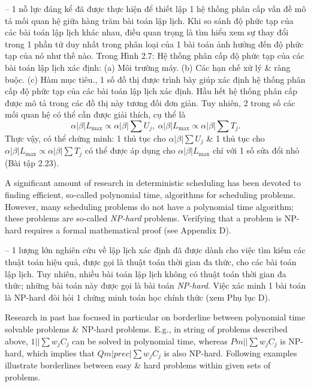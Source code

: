\documentclass{article}
\begin{document}
\begin{itemize}
\begin{itemize}
        -- 1 nỗ lực đáng kể đã được thực hiện để thiết lập 1 hệ thống phân cấp vấn đề mô tả mối quan hệ giữa hàng trăm bài toán lập lịch. Khi so sánh độ phức tạp của các bài toán lập lịch khác nhau, điều quan trọng là tìm hiểu xem sự thay đổi trong 1 phần tử duy nhất trong phân loại của 1 bài toán ảnh hưởng đến độ phức tạp của nó như thế nào. Trong {\sf Hình 2.7: Hệ thống phân cấp độ phức tạp của các bài toán lập lịch xác định: (a) Môi trường máy. (b) Các hạn chế xử lý \& ràng buộc. (c) Hàm mục tiêu.}, 1 số đồ thị được trình bày giúp xác định hệ thống phân cấp độ phức tạp của các bài toán lập lịch xác định. Hầu hết hệ thống phân cấp được mô tả trong các đồ thị này tương đối đơn giản. Tuy nhiên, 2 trong số các mối quan hệ có thể cần được giải thích, cụ thể là
        \begin{equation*}
            \alpha|\beta|L_{\max}\propto\alpha|\beta|\sum U_j,\ \alpha|\beta|L_{\max}\propto\alpha|\beta|\sum T_j.
        \end{equation*}
        Thực vậy, có thể chứng minh: 1 thủ tục cho $\alpha|\beta|\sum U_j$ \& 1 thủ tục cho $\alpha|\beta|L_{\max}\propto\alpha|\beta|\sum T_j$ có thể được áp dụng cho $\alpha|\beta|L_{\max}$ chỉ với 1 số sửa đổi nhỏ (Bài tập 2.23).

        A significant amount of research in deterministic scheduling has been devoted to finding efficient, so-called polynomial time, algorithms for scheduling problems. However, many scheduling problems do not have a polynomial time algorithm; these problems are so-called {\it NP-hard} problems. Verifying that a problem is NP-hard requires a formal mathematical proof (see Appendix D).

        -- 1 lượng lớn nghiên cứu về lập lịch xác định đã được dành cho việc tìm kiếm các thuật toán hiệu quả, được gọi là thuật toán thời gian đa thức, cho các bài toán lập lịch. Tuy nhiên, nhiều bài toán lập lịch không có thuật toán thời gian đa thức; những bài toán này được gọi là bài toán {\it NP-hard}. Việc xác minh 1 bài toán là NP-hard đòi hỏi 1 chứng minh toán học chính thức (xem Phụ lục D).

        Research in past has focused in particular on borderline between polynomial time solvable problems \& NP-hard problems. E.g., in string of problems described above, $1||\sum w_jC_j$ can be solved in polynomial time, whereas $Pm||\sum w_jC_j$ is NP-hard, which implies that $Qm|prec|\sum w_jC_j$ is also NP-hard. Following examples illustrate borderlines between easy \& hard problems within given sets of problems.


\end{itemize}
\end{itemize}
\end{document}

